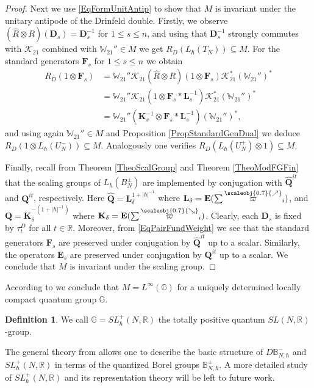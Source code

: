 \documentclass[11pt, reqno]{amsart}
\theoremstyle{definition}
\newtheorem{defn}[theorem]{Definition}
\numberwithin{equation}{section}
\newcommand{\Qb}{\mathbf{Q}}
\newcommand{\Kc}{\mathcal{K}}
\newcommand{\Nilp}{U}
\newcommand{\Bor}{B}
\newcommand{\Tor}{T}
\newcommand{\nears}{\scaleobj{0.7}{\nearrow}}
\newcommand{\sears}{\scaleobj{0.7}{\searrow}}
\newcommand{\nevarpi}{\overset{\nears}{\varpi}}
\newcommand{\sevarpi}{\overset{\sears}{\varpi}}
\newcommand{\Eb}{\mathbf{E}}
\newcommand{\Fb}{\mathbf{F}}
\newcommand{\Kb}{\mathbf{K}}
\newcommand{\Lb}{\mathbf{L}}
\newcommand{\Db}{\mathbf{D}}
\newcommand{\Wbb}{\mathbb{W}}
\newcommand{\G}{\mathbb{G}}
\newcommand{\Bbbb}{\mathbb{B}}
\begin{document}
\begin{proof}
Next we use \eqref{EqFormUnitAntip} to show that $ M $ is invariant under the unitary antipode of the Drinfeld double. Firstly, we observe $ (\hat{R} \otimes R)(\Db_s) = \Db_s^{-1} $ for $ 1 \leq s \leq n $, and using that $ \Db_s^{-1} $ strongly commutes with $ \Kc_{21} $ combined with $ \Wbb_{21}'' \in M $ we get $ R_D(L_\hbar(\Tor_N)) \subseteq M $. 
For the standard generators $ \Fb_s $ for $ 1 \leq s \leq n $ we obtain 
\begin{align*}
R_D(1 \otimes \Fb_s) &= \Wbb_{21}'' \Kc_{21} (\hat{R} \otimes R)(1 \otimes \Fb_s) \Kc_{21}^* (\Wbb_{21}'')^* \\
&= \Wbb_{21}'' \Kc_{21} (1 \otimes \Fb_s * \Lb_s^{-1}) \Kc^*_{21} (\Wbb_{21}'')^* \\ 
&= \Wbb_{21}'' (\Kb_s^{-1} \otimes \Fb_s * \Lb_s^{-1}) (\Wbb_{21}'')^*, 
\end{align*}
and using again $ \Wbb_{21}'' \in M $ and Proposition \ref{PropStandardGenDual} we deduce $ R_D(1 \otimes L_\hbar(\Nilp_N^-)) \subseteq M $. 
Analogously one verifies $ R_D(L_\hbar(\Nilp_N^+) \otimes 1) \subseteq M $.  

Finally, recall from Theorem \ref{TheoScalGroup} and Theorem \ref{TheoModFGFin} 
that the scaling groups of $ L_\hbar(\Bor_N^\pm) $ are implemented by conjugation with $ \hat{\Qb}^{it} $ and $ \Qb^{it} $, respectively. Here $ \hat{\Qb} = \Lb_\delta^{1 + |\hbar|^{-1}} $ where $ \Lb_\delta = \Eb(\sum \nevarpi_i) $, and $ \Qb = \Kb_\delta^{-(1 + |\hbar|^{-1})} $ where $ \Kb_\delta = \Eb(\sum \sevarpi_i) $. Clearly, each $ \Db_s $ is fixed by $ \tau^D_t $ for all $ t \in \mathbb{R} $. Moreover, from  \eqref{EqPairFundWeight} we see that the standard generators $ \Fb_s $ are preserved under conjugation by $ \hat{\Qb}^{it} $ up to a scalar. Similarly, the operators $ \Eb_s $ are preserved under conjugation by $ \Qb^{it} $ up to a scalar. We conclude that $ M $ is invariant under the scaling group. 
\end{proof}

According to \cite[Proposition A.5]{BV05} we conclude that $ M = L^\infty(\G) $ for a uniquely determined locally compact quantum group $ \G $. 

\begin{defn}
We call $ \G = SL_\hbar^+(N, \mathbb{R}) $ the totally positive quantum $ SL(N, \mathbb{R}) $-group. 
\end{defn}

The general theory from \cite{BV05} allows one to describe the basic structure of $ D \Bbbb_{N, \hbar}^- $ and $ SL_\hbar^+(N, \mathbb{R}) $ in terms of the quantized Borel groups $ \Bbbb_{N, \hbar}^\pm $.  
A more detailed study of $ SL_\hbar^+(N, \mathbb{R}) $ and its representation theory will be left to future work. 
\end{document}
